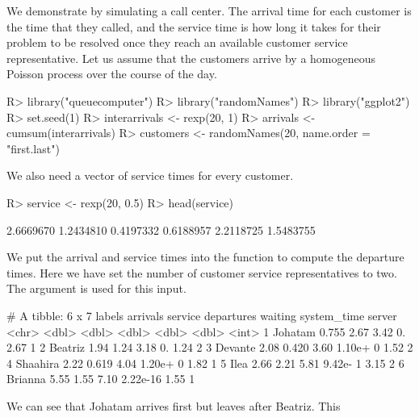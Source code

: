\documentclass[article]{jss}
\begin{document}
We demonstrate  by simulating a call center. The
arrival time for each customer is the time that they called, and the
service time is how long it takes for their problem to be resolved
once they reach an available customer service representative. Let us
assume that the customers arrive by a homogeneous Poisson process over
the course of the day.
%
\begin{CodeChunk}
\begin{Sinput}
R> library("queuecomputer")
R> library("randomNames") 
R> library("ggplot2")
R> set.seed(1) 
R> interarrivals <- rexp(20, 1)
R> arrivals <- cumsum(interarrivals)
R> customers <- randomNames(20, name.order = "first.last")
\end{Sinput}
\end{CodeChunk}
%
We also need a vector of service times for every customer.
%
\begin{CodeChunk}
\begin{Sinput}
R> service <- rexp(20, 0.5)
R> head(service)
\end{Sinput}
\begin{Soutput}
[1] 2.6669670 1.2434810 0.4197332 0.6188957 2.2118725 1.5483755
\end{Soutput}
\end{CodeChunk}
%
We put the arrival and service times into the 
function to compute the departure times. Here we have set the number
of customer service representatives to two. The  argument
is used for this input.
%
\begin{CodeChunk}
\begin{Soutput}
# A tibble: 6 x 7
  labels   arrivals service departures  waiting system_time server
  <chr>       <dbl>   <dbl>      <dbl>    <dbl>       <dbl>  <int>
1 Johatam     0.755   2.67        3.42 0.              2.67      1
2 Beatriz     1.94    1.24        3.18 0.              1.24      2
3 Devante     2.08    0.420       3.60 1.10e+ 0        1.52      2
4 Shaahira    2.22    0.619       4.04 1.20e+ 0        1.82      1
5 Ilea        2.66    2.21        5.81 9.42e- 1        3.15      2
6 Brianna     5.55    1.55        7.10 2.22e-16        1.55      1
\end{Soutput}
\end{CodeChunk}
%
We can see that Johatam arrives first but leaves after Beatriz. This
\end{document}
